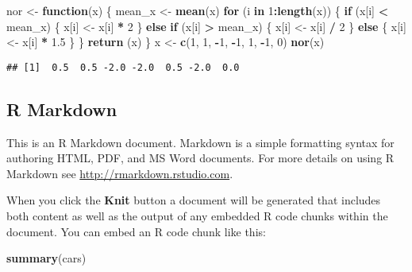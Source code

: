 \documentclass[
]{article}
\newenvironment{Shaded}{\begin{snugshade}}{\end{snugshade}}
\newcommand{\ControlFlowTok}[1]{\textcolor[rgb]{0.13,0.29,0.53}{\textbf{#1}}}
\newcommand{\DecValTok}[1]{\textcolor[rgb]{0.00,0.00,0.81}{#1}}
\newcommand{\FloatTok}[1]{\textcolor[rgb]{0.00,0.00,0.81}{#1}}
\newcommand{\FunctionTok}[1]{\textcolor[rgb]{0.13,0.29,0.53}{\textbf{#1}}}
\newcommand{\NormalTok}[1]{#1}
\newcommand{\OtherTok}[1]{\textcolor[rgb]{0.56,0.35,0.01}{#1}}
\newcommand{\SpecialCharTok}[1]{\textcolor[rgb]{0.81,0.36,0.00}{\textbf{#1}}}
\begin{document}
\begin{Shaded}
\begin{Highlighting}[]
\NormalTok{nor }\OtherTok{\textless{}{-}} \ControlFlowTok{function}\NormalTok{(x) \{}
\NormalTok{  mean\_x }\OtherTok{\textless{}{-}} \FunctionTok{mean}\NormalTok{(x)}
  \ControlFlowTok{for}\NormalTok{ (i }\ControlFlowTok{in} \DecValTok{1}\SpecialCharTok{:}\FunctionTok{length}\NormalTok{(x)) \{}
    \ControlFlowTok{if}\NormalTok{ (x[i] }\SpecialCharTok{\textless{}}\NormalTok{ mean\_x) \{}
\NormalTok{      x[i] }\OtherTok{\textless{}{-}}\NormalTok{ x[i] }\SpecialCharTok{*} \DecValTok{2}
\NormalTok{    \} }\ControlFlowTok{else} \ControlFlowTok{if}\NormalTok{ (x[i] }\SpecialCharTok{\textgreater{}}\NormalTok{ mean\_x) \{}
\NormalTok{      x[i] }\OtherTok{\textless{}{-}}\NormalTok{ x[i] }\SpecialCharTok{/} \DecValTok{2}
\NormalTok{    \} }\ControlFlowTok{else}\NormalTok{ \{}
\NormalTok{      x[i] }\OtherTok{\textless{}{-}}\NormalTok{ x[i] }\SpecialCharTok{*} \FloatTok{1.5}
\NormalTok{    \}}
\NormalTok{  \}}
  \FunctionTok{return}\NormalTok{ (x)}
\NormalTok{\}}
\NormalTok{x }\OtherTok{\textless{}{-}} \FunctionTok{c}\NormalTok{(}\DecValTok{1}\NormalTok{, }\DecValTok{1}\NormalTok{, }\SpecialCharTok{{-}}\DecValTok{1}\NormalTok{, }\SpecialCharTok{{-}}\DecValTok{1}\NormalTok{, }\DecValTok{1}\NormalTok{, }\SpecialCharTok{{-}}\DecValTok{1}\NormalTok{, }\DecValTok{0}\NormalTok{)}
\FunctionTok{nor}\NormalTok{(x)}
\end{Highlighting}
\end{Shaded}

\begin{verbatim}
## [1]  0.5  0.5 -2.0 -2.0  0.5 -2.0  0.0
\end{verbatim}

\hypertarget{r-markdown}{%
\subsection{R Markdown}\label{r-markdown}}

This is an R Markdown document. Markdown is a simple formatting syntax
for authoring HTML, PDF, and MS Word documents. For more details on
using R Markdown see \url{http://rmarkdown.rstudio.com}.

When you click the \textbf{Knit} button a document will be generated
that includes both content as well as the output of any embedded R code
chunks within the document. You can embed an R code chunk like this:

\begin{Shaded}
\begin{Highlighting}[]
\FunctionTok{summary}\NormalTok{(cars)}
\end{Highlighting}
\end{Shaded}
\end{document}
